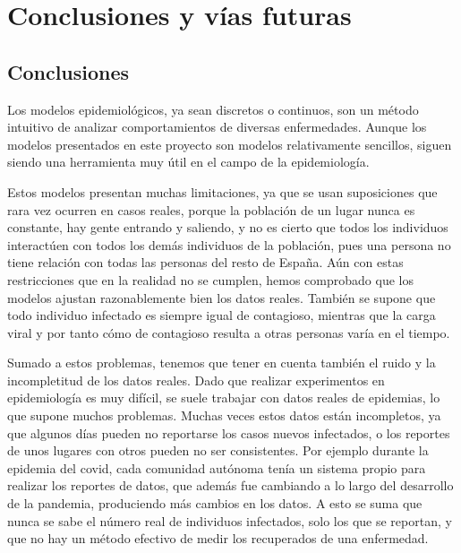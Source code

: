 
\chapter{Conclusiones y vías futuras}

\section{Conclusiones}

Los modelos epidemiológicos, ya sean discretos o continuos, son un método intuitivo de analizar comportamientos de diversas enfermedades. Aunque los modelos presentados en este proyecto son modelos relativamente sencillos, siguen siendo una herramienta muy útil en el campo de la epidemiología.

Estos modelos presentan muchas limitaciones, ya que se usan suposiciones que rara vez ocurren en casos reales, porque la población de un lugar nunca es constante, hay gente entrando y saliendo, y no es cierto que todos los individuos interactúen con todos los demás individuos de la población, pues una persona no tiene relación con todas las personas del resto de España. Aún con estas restricciones que en la realidad no se cumplen, hemos comprobado que los modelos ajustan razonablemente bien los datos reales. También se supone que todo individuo infectado es siempre igual de contagioso, mientras que la carga viral y por tanto cómo de contagioso resulta a otras personas varía en el tiempo.

Sumado a estos problemas, tenemos que tener en cuenta también el ruido y la incompletitud de los datos reales. Dado que realizar experimentos en epidemiología es muy difícil, se suele trabajar con datos reales de epidemias, lo que supone muchos problemas. Muchas veces estos datos están incompletos, ya que algunos días pueden no reportarse los casos nuevos infectados, o los reportes de unos lugares con otros pueden no ser consistentes. Por ejemplo durante la epidemia del covid, cada comunidad autónoma tenía un sistema propio para realizar los reportes de datos, que además fue cambiando a lo largo del desarrollo de la pandemia, produciendo más cambios en los datos. A esto se suma que nunca se sabe el número real de individuos infectados, solo los que se reportan, y que no hay un método efectivo de medir los recuperados de una enfermedad.

